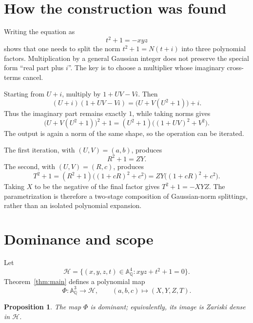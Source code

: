 \documentclass[11pt]{article}
\newtheorem{proposition}[theorem]{Proposition}
\theoremstyle{remark}
\newcommand{\A}{\mathbb A}
\newcommand{\Q}{\mathbb Q}
\begin{document}
\section{How the construction was found}\label{sec:discovery}

Writing the equation as
\begin{equation}\label{eq:target-factorization}
t^2+1=-xyz
\end{equation}
shows that one needs to split the norm $t^2+1=N(t+i)$ into three
polynomial factors.  Multiplication by a general Gaussian integer does
not preserve the special form ``real part plus $i$''.  The key is to
choose a multiplier whose imaginary cross-terms cancel.

Starting from $U+i$, multiply by $1+UV-Vi$.  Then
\[
(U+i)(1+UV-Vi)=\bigl(U+V(U^2+1)\bigr)+i.
\]
Thus the imaginary part remains exactly $1$, while taking norms gives
\[
\bigl(U+V(U^2+1)\bigr)^2+1
=(U^2+1)\bigl((1+UV)^2+V^2\bigr).
\]
The output is again a norm of the same shape, so the operation can be
iterated.

The first iteration, with $(U,V)=(a,b)$, produces
\[
R^2+1=ZY.
\]
The second, with $(U,V)=(R,c)$, produces
\[
T^2+1=(R^2+1)\bigl((1+cR)^2+c^2\bigr)
      =ZY\bigl((1+cR)^2+c^2\bigr).
\]
Taking $X$ to be the negative of the final factor gives
$T^2+1=-XYZ$.  The parametrization is therefore a two-stage
composition of Gaussian-norm splittings, rather than an isolated
polynomial expansion.

\section{Dominance and scope}

Let
\[
\mathcal H=\{(x,y,z,t)\in\A^4_{\Q}:xyz+t^2+1=0\}.
\]
Theorem~\ref{thm:main} defines a polynomial map
\[
\Phi:\A^3_{\Q}\longrightarrow\mathcal H,
\qquad
(a,b,c)\longmapsto(X,Y,Z,T).
\]

\begin{proposition}\label{prop:dominant}
The map $\Phi$ is dominant; equivalently, its image is Zariski dense
in $\mathcal H$.
\end{proposition}
\end{document}
